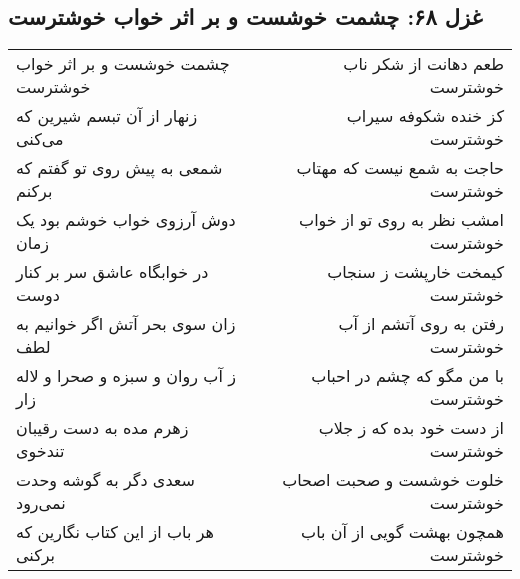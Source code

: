 \begin{center}
\section*{غزل ۶۸: چشمت خوشست و بر اثر خواب خوشترست}
\label{sec:068}
\begin{longtable}{l p{0.5cm} r}
چشمت خوشست و بر اثر خواب خوشترست
&&
طعم دهانت از شکر ناب خوشترست
\\
زنهار از آن تبسم شیرین که می‌کنی
&&
کز خنده شکوفه سیراب خوشترست
\\
شمعی به پیش روی تو گفتم که برکنم
&&
حاجت به شمع نیست که مهتاب خوشترست
\\
دوش آرزوی خواب خوشم بود یک زمان
&&
امشب نظر به روی تو از خواب خوشترست
\\
در خوابگاه عاشق سر بر کنار دوست
&&
کیمخت خارپشت ز سنجاب خوشترست
\\
زان سوی بحر آتش اگر خوانیم به لطف
&&
رفتن به روی آتشم از آب خوشترست
\\
ز آب روان و سبزه و صحرا و لاله زار
&&
با من مگو که چشم در احباب خوشترست
\\
زهرم مده به دست رقیبان تندخوی
&&
از دست خود بده که ز جلاب خوشترست
\\
سعدی دگر به گوشه وحدت نمی‌رود
&&
خلوت خوشست و صحبت اصحاب خوشترست
\\
هر باب از این کتاب نگارین که برکنی
&&
همچون بهشت گویی از آن باب خوشترست
\\
\end{longtable}
\end{center}
